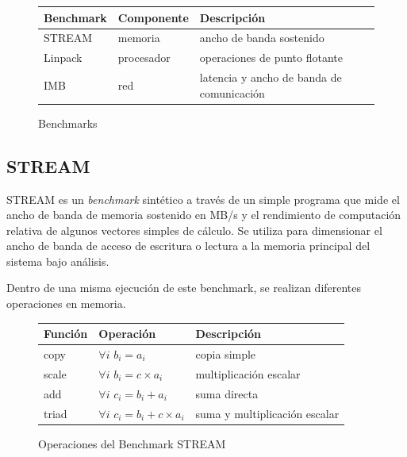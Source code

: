 \documentclass[a4paper]{report}
\begin{document}
\begin{figure}[H]
  \begin{center}
    \begin{tabular}{|l|l|l|}\hline
      {\bf Benchmark} & {\bf Componente} & {\bf Descripci\'on} \\ \hline
      STREAM & memoria & ancho de banda sostenido \\ \hline
      Linpack & procesador & operaciones de punto flotante \\ \hline
      IMB & red & latencia y ancho de banda de comunicaci\'on \\ \hline
    \end{tabular}
    \caption{Benchmarks}
  \end{center}
  \label{benchmark-list}
\end{figure}

\subsection{STREAM}

STREAM \cite{stream} es un {\it benchmark} sint\'etico a trav\'es de un simple
programa que mide el ancho de banda de memoria sostenido en MB/s y el
rendimiento de computaci\'on relativa de algunos vectores simples de c\'alculo.
Se utiliza para dimensionar el ancho de banda de acceso de escritura o lectura
a la memoria principal del sistema bajo an\'alisis.

Dentro de una misma ejecuci\'on de este benchmark, se realizan diferentes
operaciones en memoria.

\begin{figure}[H]
  \begin{center}
    \begin{tabular}{|l|l|l|}\hline
      {\bf Funci\'on} & {\bf Operaci\'on} & {\bf Descripci\'on} \\ \hline
      copy & $ \forall i $ $ b_{i} = a_{i} $ & copia simple \\ \hline
      scale & $ \forall i $ $ b_{i} = c \times a_{i} $ & multiplicaci\'on escalar \\ \hline
      add & $ \forall i $ $ c_{i} = b_{i} + a_{i} $ & suma directa \\ \hline
      triad & $ \forall i $ $ c_{i} = b_{i} + c \times a_{i} $ & suma y multiplicaci\'on escalar \\ \hline
    \end{tabular}
    \caption{Operaciones del Benchmark STREAM}
  \end{center}
  \label{stream}
\end{figure}
\end{document}
